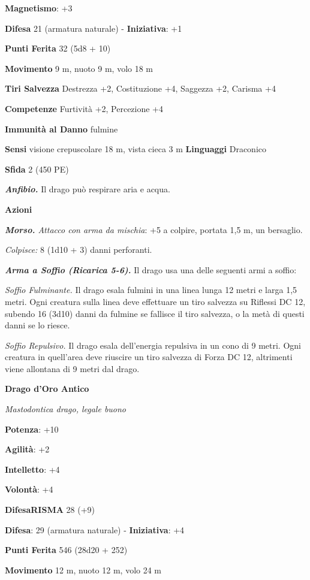 \begin{multicols}{2}
\textbf{Magnetismo}: +3

\textbf{Difesa} 21 (armatura naturale) - \textbf{Iniziativa}: +1

\textbf{Punti Ferita} 32 (5d8 + 10)

\textbf{Movimento} 9 m, nuoto 9 m, volo 18 m

\textbf{Tiri Salvezza} Destrezza +2, Costituzione +4, Saggezza +2,
Carisma +4

\textbf{Competenze} Furtività +2, Percezione +4

\textbf{Immunità al Danno} fulmine

\textbf{Sensi} visione crepuscolare 18 m, vista cieca 3 m
\textbf{Linguaggi} Draconico

\textbf{Sfida} 2 (450 PE)

\emph{\textbf{Anfibio.}} Il drago può respirare aria e acqua.

\textbf{Azioni}

\emph{\textbf{Morso.} Attacco con arma da mischia}: +5 a colpire,
portata 1,5 m, un bersaglio.

\emph{Colpisce:} 8 (1d10 + 3) danni perforanti.

\emph{\textbf{Arma a Soffio (Ricarica 5-6).}} Il drago usa una delle
seguenti armi a soffio:

\emph{Soffio Fulminante.} Il drago esala fulmini in una linea lunga 12
metri e larga 1,5 metri. Ogni creatura sulla linea deve effettuare un
tiro salvezza su Riflessi DC 12, subendo 16 (3d10) danni da fulmine se
fallisce il tiro salvezza, o la metà di questi danni se lo riesce.

\emph{Soffio Repulsivo.} Il drago esala dell'energia repulsiva in un
cono di 9 metri. Ogni creatura in quell'area deve riuscire un tiro
salvezza di Forza DC 12, altrimenti viene allontana di 9 metri dal
drago.

\textbf{Drago d'Oro Antico}

\emph{Mastodontica drago, legale buono}

\textbf{Potenza}: +10

\textbf{Agilità}: +2

\textbf{Intelletto}: +4

\textbf{Volontà}: +4

\textbf{DifesaRISMA} 28 (+9)

\textbf{Difesa}: 29 (armatura naturale) - \textbf{Iniziativa}: +4

\textbf{Punti Ferita} 546 (28d20 + 252) 

\textbf{Movimento} 12 m, nuoto 12 m, volo 24 m


\end{multicols}
